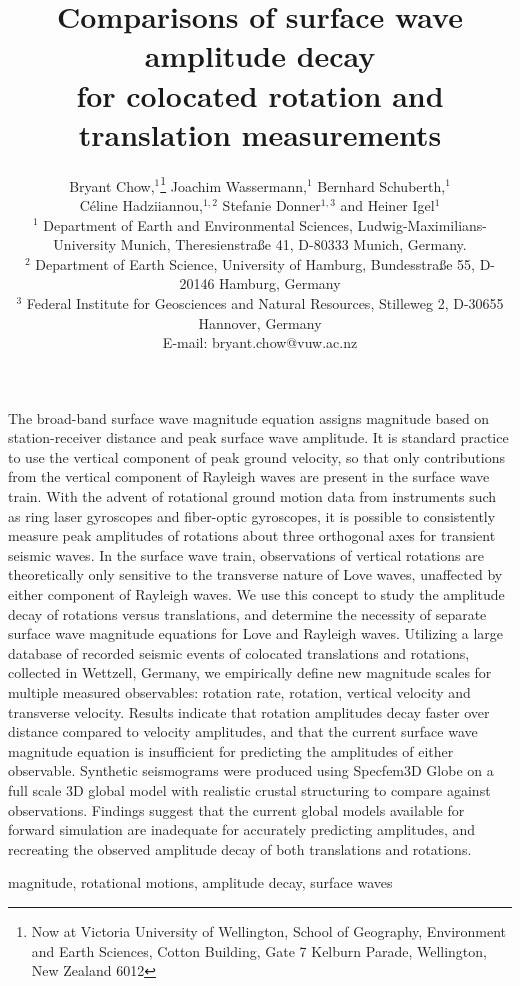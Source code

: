 \documentclass{gji}
\title[Comparisons of surface wave amplitude decay]
  {Comparisons of surface wave amplitude decay \\for colocated rotation and translation measurements}
\author[Bryant Chow]
  {Bryant Chow,$^1$\thanks{Now at Victoria University of Wellington, School of Geography, Environment and Earth Sciences, Cotton Building, Gate 7 Kelburn Parade, Wellington, New Zealand 6012} 
  Joachim Wassermann,$^1$
  Bernhard Schuberth,$^1$  \vspace{2mm}\\
  \LARGE{{\normalfont C\' eline Hadziiannou,$^{1,2}$ 
  Stefanie Donner$^{1,3}$ and
   Heiner Igel$^1$}}\vspace{2mm}  \\
  $^1$ Department of Earth and Environmental Sciences, Ludwig-Maximilians-University Munich, Theresienstra\ss e 41, D-80333 Munich, Germany.\\
  $^2$ Department of Earth Science, University of Hamburg, Bundesstra\ss e 55, D-20146 Hamburg, Germany\\
  $^3$ Federal Institute for Geosciences and Natural Resources, Stilleweg 2, D-30655 Hannover, Germany \\E-mail: bryant.chow@vuw.ac.nz
  }
\date{}
\begin{document}
\label{firstpage}

\maketitle

\begin{summary}
The broad-band surface wave magnitude equation assigns magnitude based on station-receiver distance and peak surface wave amplitude. It is standard practice to use the vertical component of peak ground velocity, so that only contributions from the vertical component of Rayleigh waves are present in the surface wave train. With the advent of rotational ground motion data from instruments such as ring laser gyroscopes and fiber-optic gyroscopes, it is possible to consistently measure peak amplitudes of rotations about three orthogonal axes for transient seismic waves. In the surface wave train, observations of vertical rotations are theoretically only sensitive to the transverse nature of Love waves, unaffected by either component of Rayleigh waves. We use this concept to study the amplitude decay of rotations versus translations, and determine the necessity of separate surface wave magnitude equations for Love and Rayleigh waves. Utilizing a large database of recorded seismic events of colocated translations and rotations, collected in Wettzell, Germany, we empirically define new magnitude scales for multiple measured observables: rotation rate, rotation, vertical velocity and transverse velocity. Results indicate that rotation amplitudes decay faster over distance compared to velocity amplitudes, and that the current surface wave magnitude equation is insufficient for predicting the amplitudes of either observable. Synthetic seismograms were produced using Specfem3D Globe on a full scale 3D global model with realistic crustal structuring to compare against observations. Findings suggest that the current global models available for forward simulation are inadequate for accurately predicting amplitudes, and recreating the observed amplitude decay of both translations and rotations.
\end{summary}

\begin{keywords}
magnitude, rotational motions, amplitude decay, surface waves
\end{keywords}
\end{document}
